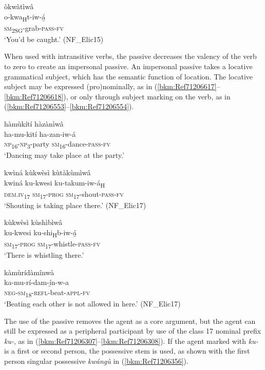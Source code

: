 \ea
\label{bkm:Ref75163980}
\glll òkwàtìwâ\\
o-kwa\textsubscript{H}t-iw-á̲\\
\textsc{sm}\textsubscript{2SG}-grab-\textsc{pass}-\textsc{fv}\\
\glt ‘You’d be caught.’ (NF\_Elic15)
\z

When used with intransitive verbs, the passive decreases the valency of the verb to zero to create an impersonal passive. An impersonal passive takes a locative grammatical subject, which has the semantic function of location. The locative subject may be expressed (pro)nominally, as in (\ref{bkm:Ref71206617}--\ref{bkm:Ref71206618}), or only through subject marking on the verb, as in (\ref{bkm:Ref71206553}--\ref{bkm:Ref71206554}).

\ea
\label{bkm:Ref71206617}
hàmùkítí hàzànìwâ\\
\gll ha-mu-kití    ha-zan-iw-á\\
\textsc{np}\textsubscript{16}-\textsc{np}\textsubscript{3}-party  \textsc{sm}\textsubscript{16}-dance-\textsc{pass}-\textsc{fv}\\
\glt ‘Dancing may take place at the party.’
\z

\ea
\label{bkm:Ref71206618}
kwìná kùkwèsì kùtàkùmìwâ\\
\gll kwiná    ku-kwesi  ku-takum-iw-á\textsubscript{H}\\
\textsc{dem}.\textsc{iv}\textsubscript{17}  \textsc{sm}\textsubscript{17}-\textsc{prog}  \textsc{sm}\textsubscript{17}-shout-\textsc{pass}-\textsc{fv}\\
\glt ‘Shouting is taking place there.’ (NF\_Elic17)
\z

\ea
\label{bkm:Ref71206553}
kùkwèsì kùshìbìwâ\\
\gll ku-kwesi  ku-shi\textsubscript{H}b-iw-á̲\\
\textsc{sm}\textsubscript{17}-\textsc{prog}  \textsc{sm}\textsubscript{17}-whistle-\textsc{pass}-\textsc{fv}\\
\glt ‘There is whistling there.’
\z

\ea
\label{bkm:Ref71206554}
\glll kàmùrídàmînwà\\
ka-mu-rí-dam-í̲n-w-a\\
\textsc{neg}-\textsc{sm}\textsubscript{18}-\textsc{refl}-beat-\textsc{appl}-\textsc{fv}\\
\glt ‘Beating each other is not allowed in here.’ (NF\_Elic17)
\z

The use of the passive removes the agent as a core argument, but the agent can still be expressed as a peripheral participant by use of the class 17 nominal prefix \textit{ku-}, as in (\ref{bkm:Ref71206307}--\ref{bkm:Ref71206308}). If the agent marked with \textit{ku-} is a first or second person, the possessive stem is used, as shown with the first person singular possessive \textit{kwángù} in (\ref{bkm:Ref71206356}).

